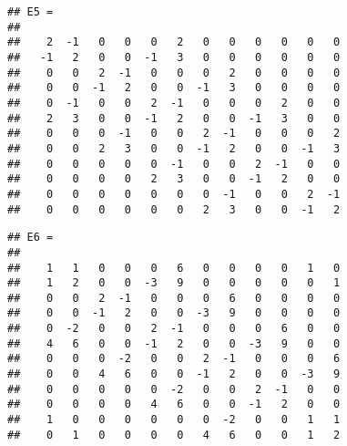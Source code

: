 \begin{samepage}
\begin{verbatim}
## E5 =
## 
##    2  -1   0   0   0   2   0   0   0   0   0   0
##   -1   2   0   0  -1   3   0   0   0   0   0   0
##    0   0   2  -1   0   0   0   2   0   0   0   0
##    0   0  -1   2   0   0  -1   3   0   0   0   0
##    0  -1   0   0   2  -1   0   0   0   2   0   0
##    2   3   0   0  -1   2   0   0  -1   3   0   0
##    0   0   0  -1   0   0   2  -1   0   0   0   2
##    0   0   2   3   0   0  -1   2   0   0  -1   3
##    0   0   0   0   0  -1   0   0   2  -1   0   0
##    0   0   0   0   2   3   0   0  -1   2   0   0
##    0   0   0   0   0   0   0  -1   0   0   2  -1
##    0   0   0   0   0   0   2   3   0   0  -1   2
\end{verbatim}
\end{samepage}

\begin{samepage}
\begin{Shaded}
	\begin{Highlighting}[]
\NormalTok{v = [}\NormalTok{;}\NormalTok{,}\NormalTok{);}\NormalTok{];}
\NormalTok{v1 = [}\NormalTok{;}\NormalTok{(}\NormalTok{));}\NormalTok{];}

\NormalTok{(}\NormalTok{(}
\NormalTok{(}\NormalTok{(}\NormalTok{(}\NormalTok{)),}\NormalTok{),}
\NormalTok{(}\NormalTok{(}\NormalTok{(}\NormalTok{)),-}\NormalTok{),}
\NormalTok{(}\NormalTok{(}\NormalTok{))));}		
	\end{Highlighting}
\end{Shaded}
\end{samepage}

\begin{samepage}
\begin{verbatim}
## E6 =
## 
##    1   1   0   0   0   6   0   0   0   0   1   0
##    1   2   0   0  -3   9   0   0   0   0   0   1
##    0   0   2  -1   0   0   0   6   0   0   0   0
##    0   0  -1   2   0   0  -3   9   0   0   0   0
##    0  -2   0   0   2  -1   0   0   0   6   0   0
##    4   6   0   0  -1   2   0   0  -3   9   0   0
##    0   0   0  -2   0   0   2  -1   0   0   0   6
##    0   0   4   6   0   0  -1   2   0   0  -3   9
##    0   0   0   0   0  -2   0   0   2  -1   0   0
##    0   0   0   0   4   6   0   0  -1   2   0   0
##    1   0   0   0   0   0   0  -2   0   0   1   1
##    0   1   0   0   0   0   4   6   0   0   1   2
\end{verbatim}
\end{samepage}


